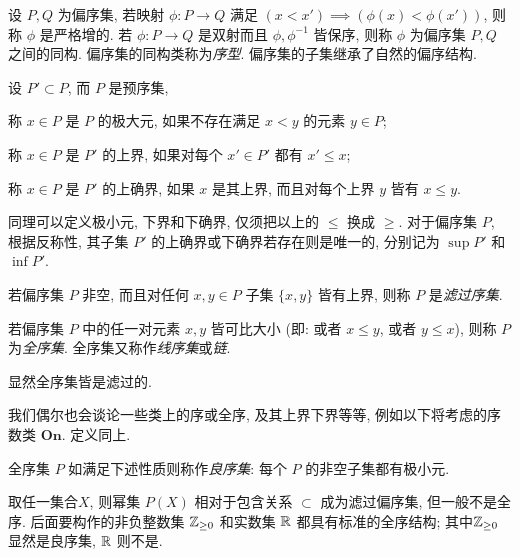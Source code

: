 设 $P, Q$ 为偏序集, 若映射 $\phi: P \to Q$ 满足 $(x < x') \implies (\phi(x) < \phi(x'))$, 则称 $\phi$ 是严格增的. 若 $\phi: P \to Q$ 是双射而且 $\phi, \phi^{-1}$ 皆保序, 则称 $\phi$ 为偏序集 $P,Q$ 之间的同构. 偏序集的同构类称为\emph{序型}. 偏序集的子集继承了自然的偏序结构.

\begin{definition}\label{def:max-sup}
	设 $P' \subset P$, 而 $P$ 是预序集,
	\begin{compactitem}
		\item 称 $x \in P$ 是 $P$ 的极大元, 如果不存在满足 $x < y$ 的元素 $y \in P$;
		\item 称 $x \in P$ 是 $P'$ 的上界, 如果对每个 $x' \in P'$ 都有 $x' \leq x$;
		\item 称 $x \in P$ 是 $P'$ 的上确界, 如果 $x$ 是其上界, 而且对每个上界 $y$ 皆有 $x \leq y$.
	\end{compactitem}
	同理可以定义极小元, 下界和下确界, 仅须把以上的 $\leq$ 换成 $\geq$. 对于偏序集 $P$, 根据反称性, 其子集 $P'$ 的上确界或下确界若存在则是唯一的, 分别记为 $\sup P'$ 和 $\inf P'$. 
\end{definition}

\begin{definition}\label{def:filtrant-poset}
	若偏序集 $P$ 非空, 而且对任何 $x,y \in P$ 子集 $\{x,y\}$ 皆有上界, 则称 $P$ 是\emph{滤过序集}.
\end{definition}

\begin{definition}
	若偏序集 $P$ 中的任一对元素 $x,y$ 皆可比大小 (即: 或者 $x \leq y$, 或者 $y \leq x$), 则称 $P$ 为\emph{全序集}. 全序集又称作\emph{线序集}或\emph{链}.
\end{definition}
显然全序集皆是滤过的.

我们偶尔也会谈论一些类上的序或全序, 及其上界下界等等, 例如以下将考虑的序数类 $\textbf{On}$. 定义同上.

\begin{definition}[G.\ Cantor]\label{def:well-ordered}
	全序集 $P$ 如满足下述性质则称作\emph{良序集}: 每个 $P$ 的非空子集都有极小元.
\end{definition}

\begin{example}
	取任一集合$X$, 则幂集 $P(X)$ 相对于包含关系 $\subset$ 成为滤过偏序集, 但一般不是全序. 后面要构作的非负整数集 $\mathbb{Z}_{\geq 0}$ 和实数集 $\mathbb{R}$ 都具有标准的全序结构; 其中$\mathbb{Z}_{\geq 0}$ 显然是良序集, $\mathbb{R}$ 则不是.
\end{example}

